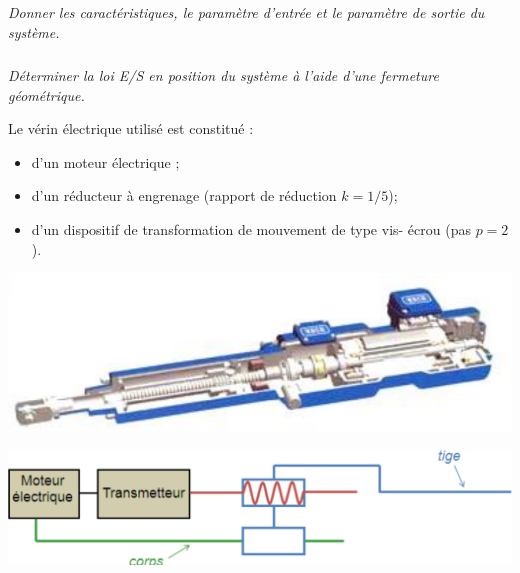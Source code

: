 \documentclass[10pt,fleqn]{article} %
\begin{document}
\begin{multicols}{2}
\subparagraph{}
\textit{Donner les caractéristiques, le paramètre d’entrée et le paramètre de sortie du système.}

\ifprof
\begin{corrige}
\end{corrige}
\else \fi

\subparagraph{}
\textit{Déterminer la loi E/S en position du système à l’aide d’une fermeture géométrique. }

\ifprof
\begin{corrige}
\end{corrige}
\else \fi



Le vérin électrique utilisé est constitué : 
\begin{itemize}
\item d’un moteur électrique ;
\item d’un réducteur à engrenage (rapport de réduction $k=1/5$);
\item d’un dispositif de transformation de mouvement de type vis-
écrou (pas $p=2$). 
\end{itemize}
\begin{center}
\includegraphics[width=.95\linewidth]{images/fig7} 
\end{center}

\begin{center}
\includegraphics[width=.95\linewidth]{images/fig8} 
\end{center}


\end{multicols}
\end{document}
